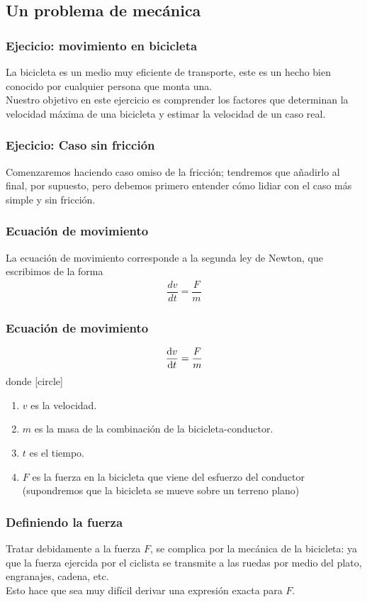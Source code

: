 \subsection{Un problema de mecánica}
\begin{frame}
\frametitle{Ejecicio: movimiento en bicicleta}
La bicicleta es un medio muy eficiente de transporte, este es un hecho bien conocido por cualquier persona que monta una. 
\\
\bigskip
Nuestro objetivo en este ejercicio es comprender los factores que determinan la velocidad máxima de una bicicleta y estimar la velocidad de un caso real.
\end{frame}
\begin{frame}
\frametitle{Ejecicio: Caso sin fricción}
Comenzaremos haciendo caso omiso de la fricción; tendremos que añadirlo al final, por supuesto, pero debemos primero entender cómo lidiar con el caso más simple y sin fricción.
\end{frame}
\begin{frame}
\frametitle{Ecuación de movimiento}
La ecuación de movimiento corresponde a la segunda ley de Newton, que escribimos de la forma
\begin{align}
\dfrac{dv}{dt} = \dfrac{F}{m}
\label{EqNewton2}
\end{align}
\end{frame}
\begin{frame}
\frametitle{Ecuación de movimiento}
\begin{equation*}
\dv{v}{t} = \dfrac{F}{m}
\end{equation*}
donde
[circle]
\begin{enumerate}[<+->]
\fontsize{13}{13}\selectfont
\item $v$ es la velocidad.
\item $m$ es la masa de la combinación de la bicicleta-conductor.
\item $t$ es el tiempo.
\item $F$ es la fuerza en la bicicleta que viene del esfuerzo del conductor (supondremos que la bicicleta se mueve sobre un terreno plano)
\end{enumerate}
\end{frame}
\begin{frame}
\frametitle{Definiendo la fuerza}
Tratar debidamente a la fuerza $F$, se complica por la mecánica de la bicicleta: ya que la fuerza ejercida por el ciclista se transmite a las ruedas por medio del plato, engranajes, cadena, etc.
\\
\medskip
Esto hace que sea muy difícil derivar una expresión exacta para $F$.
\end{frame}
